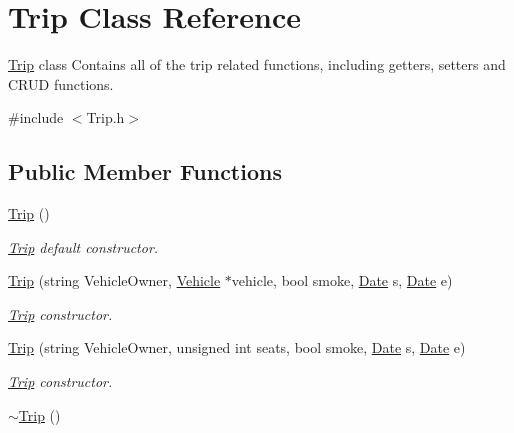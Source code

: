 \hypertarget{class_trip}{\section{Trip Class Reference}
\label{class_trip}
}


\hyperlink{class_trip}{Trip} class Contains all of the trip related functions, including getters, setters and C\+R\+U\+D functions.  




{\ttfamily \#include $<$Trip.\+h$>$}

\subsection*{Public Member Functions}
\begin{DoxyCompactItemize}
\item 
\hypertarget{class_trip_aa67b77d0d2de622ed5eb9e9cad34db8f}{\hyperlink{class_trip_aa67b77d0d2de622ed5eb9e9cad34db8f}{Trip} ()}\label{class_trip_aa67b77d0d2de622ed5eb9e9cad34db8f}

\begin{DoxyCompactList}\small\item\em \hyperlink{class_trip}{Trip} default constructor. \end{DoxyCompactList}\item 
\hyperlink{class_trip_a0d0fce19644be21e8baec31492ad58fa}{Trip} (string Vehicle\+Owner, \hyperlink{class_vehicle}{Vehicle} $\ast$vehicle, bool smoke, \hyperlink{class_date}{Date} s, \hyperlink{class_date}{Date} e)
\begin{DoxyCompactList}\small\item\em \hyperlink{class_trip}{Trip} constructor. \end{DoxyCompactList}\item 
\hyperlink{class_trip_a71b15d051b75c1d1eee38a5c38191920}{Trip} (string Vehicle\+Owner, unsigned int seats, bool smoke, \hyperlink{class_date}{Date} s, \hyperlink{class_date}{Date} e)
\begin{DoxyCompactList}\small\item\em \hyperlink{class_trip}{Trip} constructor. \end{DoxyCompactList}\item 
\hypertarget{class_trip_a2376daed3b03469163782ef0d0533d52}{\hyperlink{class_trip_a2376daed3b03469163782ef0d0533d52}{$\sim$\+Trip} ()}\label{class_trip_a2376daed3b03469163782ef0d0533d52}


\end{DoxyCompactItemize}
